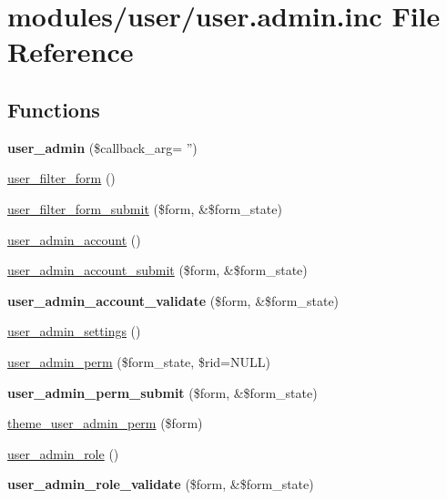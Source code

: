 \hypertarget{user_8admin_8inc}{
\section{modules/user/user.admin.inc File Reference}
\label{user_8admin_8inc}
}
\subsection*{Functions}
\begin{CompactItemize}
\item 
\hypertarget{user_8admin_8inc_16b515af1b1f5d114383d668812c0b9b}{
\textbf{user\_\-admin} (\$callback\_\-arg= '')}
\label{user_8admin_8inc_16b515af1b1f5d114383d668812c0b9b}

\item 
\hyperlink{group__forms_g4492f8566743ff967248ff7d22108a54}{user\_\-filter\_\-form} ()
\item 
\hyperlink{user_8admin_8inc_edf12621a6f405cf3032a9319771b4e1}{user\_\-filter\_\-form\_\-submit} (\$form, \&\$form\_\-state)
\item 
\hyperlink{group__forms_g3dde5a35fbda589c3fb9a4bb6d4b1d9a}{user\_\-admin\_\-account} ()
\item 
\hyperlink{user_8admin_8inc_20540c356ad435d034ff0229323f33d5}{user\_\-admin\_\-account\_\-submit} (\$form, \&\$form\_\-state)
\item 
\hypertarget{user_8admin_8inc_677766378db180ef3601f618951f35e0}{
\textbf{user\_\-admin\_\-account\_\-validate} (\$form, \&\$form\_\-state)}
\label{user_8admin_8inc_677766378db180ef3601f618951f35e0}

\item 
\hyperlink{group__forms_g8cb1bc70278e0e628fd17c2ec8353bd1}{user\_\-admin\_\-settings} ()
\item 
\hyperlink{group__forms_g6e5c6e76662734247a6c7ee90af67b26}{user\_\-admin\_\-perm} (\$form\_\-state, \$rid=NULL)
\item 
\hypertarget{user_8admin_8inc_93527004944d8ffc8f61b27fd37e85ae}{
\textbf{user\_\-admin\_\-perm\_\-submit} (\$form, \&\$form\_\-state)}
\label{user_8admin_8inc_93527004944d8ffc8f61b27fd37e85ae}

\item 
\hyperlink{group__themeable_gf699cde524801368ec966785c8dfc0ee}{theme\_\-user\_\-admin\_\-perm} (\$form)
\item 
\hyperlink{group__forms_g90d892becb335c456346eecbbc3bb6de}{user\_\-admin\_\-role} ()
\item 
\hypertarget{user_8admin_8inc_d03d629a48434e2a62448d3ef2dec1bd}{
\textbf{user\_\-admin\_\-role\_\-validate} (\$form, \&\$form\_\-state)}
\label{user_8admin_8inc_d03d629a48434e2a62448d3ef2dec1bd}


\end{CompactItemize}
